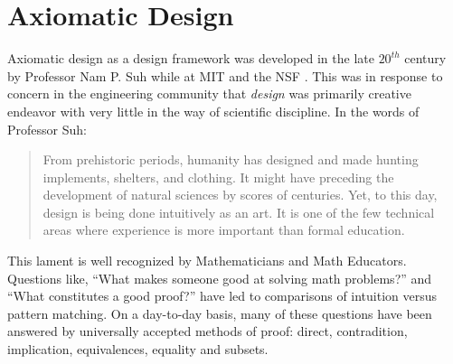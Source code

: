 \section{Axiomatic Design}

Axiomatic design as a design framework was developed in the late \(20^{th}\) century by Professor Nam P. Suh while
at MIT and the NSF \cite{suh}.  This was in response to concern in the engineering community that \emph{design} was
primarily creative endeavor with very little in the way of scientific discipline.  In the words of Professor Suh:
\begin{quote}
  From prehistoric periods, humanity has designed and made hunting implements, shelters, and clothing.  It might have
  preceding the development of natural sciences by scores of centuries.  Yet, to this day, design is being done
  intuitively as an art.  It is one of the few technical areas where experience is more important than formal
  education.
\end{quote}
This lament is well recognized by Mathematicians and Math Educators. Questions like, ``What makes someone good at
solving math problems?'' and ``What constitutes a good proof?'' have led to comparisons of intuition versus
pattern matching.  On a day-to-day basis, many of these questions have been answered by universally accepted methods
of proof: direct, contradition, implication, equivalences, equality and subsets.
